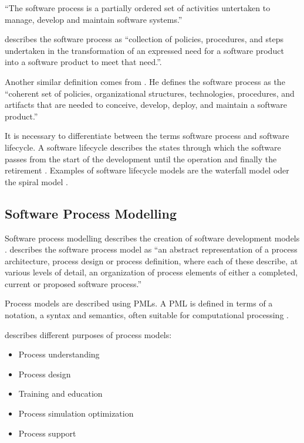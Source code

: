 ``The software process is a partially ordered set of activities untertaken to manage, develop and maintain software systems.'' \citep{Acuna:2001aa}

\cite{McChesney:1995aa} describes the software process as ``collection of policies, procedures, and steps undertaken in the transformation of an expressed need for a software product into a software product to meet that need.''.

Another similar definition comes from \cite{Fuggetta:2000ds}. He defines the software process as the ``coherent set of policies, organizational structures, technologies, procedures, and artifacts that are needed to conceive, develop, deploy, and maintain a software product.''

It is necessary to differentiate between the terms software process and software lifecycle. A software lifecycle describes the states through which the software passes from the start of the development until the operation and finally the retirement \citep{Acuna:aa}. 
Examples of software lifecycle models are the waterfall model \citep{Royce:1987tl} oder the spiral model \citep{Boehm:1988cd}.

\subsection{Software Process Modelling}
Software process modelling describes the creation of software development models \citep{Acuna:2001aa}. \cite{Feiler:1993aa} describes the software process model as ``an abstract representation  of a process architecture, process design or process definition, where each of these describe, at various levels of detail, an organization of process elements of either a completed, current or proposed software process.''

Process models are described using \acp{PML}. A \ac{PML} is defined in terms of a notation, a syntax and semantics, often suitable for computational processing \citep{Bendraou:2005dv}.

\cite{Fuggetta:2000ds} describes different purposes of process models:
\begin{itemize}
	\item Process understanding
	\item Process design
	\item Training and education
	\item Process simulation  optimization
	\item Process support
\end{itemize}

